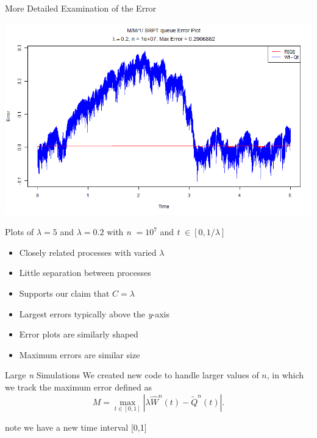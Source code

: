 \documentclass[16pt]{beamer}
\newcommand{\What}{\widehat{W}^{n}(t)}
\newcommand{\Qtild}{\widetilde{Q}^{n}(t)}
\begin{document}
\begin{frame}
\begin{textblock}{35}
\begin{block}{\huge More Detailed Examination of the Error}
\begin{minipage}[t]{17cm}
\vspace{0.5cm}
\includegraphics[width=17cm]{Pictures/errorPlot02.png}
\end{minipage}
\vspace{\baselineskip}

{\large Plots of $\lambda = 5$ and $\lambda = 0.2$ with \emph{n }$=10^7$ and \emph{t }$\in [0,1/\lambda]$}
\begin{minipage}[t]{17cm}
\begin{itemize}
\item Closely related processes with varied {\color{orange}$\lambda$}
\item Little separation between processes
\item Supports our claim that {\color{orange}$C=\lambda$}
\end{itemize}
\end{minipage}
\begin{minipage}[t]{17cm}
\begin{itemize}
\item Largest errors typically above the \emph{y}-axis
\item Error plots are similarly shaped
\item Maximum errors are similar size
\end{itemize}
\end{minipage}
\end{block}

\begin{block}{\huge  Large \emph{n} Simulations}
We created new code to handle larger values of $n$, in which we track the maximum error defined as
\[
M = \max_{t\in[0,1]} \left | \lambda \What - \Qtild \right |.
\]
\begin{center}
{\footnotesize note we have a new time interval [0,1]}
\end{center}


\end{block}
\end{textblock}
\end{frame}
\end{document}
